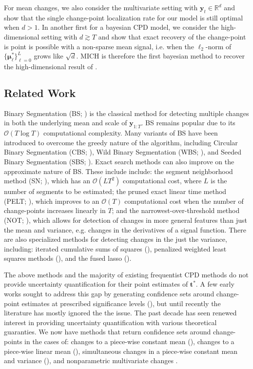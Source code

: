 For mean changes, we also consider the multivariate setting with $\mathbf{y}_t \in \mathbb{R}^d$ and show that the single change-point localization rate for our model is still optimal when $d > 1$. In another first for a bayesian CPD model, we consider the high-dimensional setting with $d \gtrsim T$ and show that exact recovery of the change-point is point is possible with a non-sparse mean signal, i.e. when the $\ell_2$-norm of $\{\boldsymbol{\mu}^*_\ell\}_{\ell=0}^{L}$ grows like $\sqrt{d}$. MICH is therefore the first bayesian method to recover the high-dimensional result of \cite{Bai10}.  

\subsection{Related Work}

Binary Segmentation (BS; \citealp{Scott74, Sen75, Vostrikova81}) is the classical method for detecting multiple changes in both the underlying mean and scale of $\mathbf{y}_{1:T}$. BS remains popular due to its $\mathcal{O}(T\log T)$ computational complexity. Many variants of BS have been introduced to overcome the greedy nature of the algorithm, including Circular Binary Segmentation (CBS; \citealp{Olshen04}), Wild Binary Segmentation (WBS; \citealp{Fryzlewicz14}), and Seeded Binary Segmentation (SBS; \citealp{Kovacs22}). Exact search methods can also improve on the approximate nature of BS. These include include: the segment neighborhood method (SN; \citealp{Auger89}), which has an $\mathcal{O}(LT^2)$ computational cost, where $L$ is the number of segments to be estimated; the pruned exact linear time method (PELT; \citealp{Killick12}), which improves to an $\mathcal{O}(T)$ computational cost when the number of change-points increases linearly in $T$; and the narrowest-over-threshold method (NOT; \citealp{Baranowski19}), which allows for detection of changes in more general features than just the mean and variance, e.g. changes in the derivatives of a signal function. There are also specialized methods for detecting changes in the just the variance, including: iterated cumulative sums of squares (\citealp{Inclan94}), penalized weighted least squares methods (\citealp{Chen97, Gao19}), and the fused lasso (\citealp{Padilla22}). 

The above methods and the majority of existing frequentist CPD methods do not provide uncertainty quantification for their point estimates of $\mathbf{t}^*$. A few early works sought to address this gap by generating confidence sets around change-point estimates at prescribed significance levels (\citealp{Worsley86, Siegmund86, Bai03}), but until recently the literature has mostly ignored the the issue. The past decade has seen renewed interest in providing uncertainty quantification with various theoretical guaranties. We now have methods that return confidence sets around change-points in the cases of: changes to a piece-wise constant mean (\citealp{Frick14, Fang20, Jewell22}), changes to a piece-wise linear mean (\citealp{Fryzlewicz23}),  simultaneous changes in a piece-wise constant mean and variance (\citealp{Bai10, Pein17, Eichinger18}), and nonparametric multivariate changes \cite{madrid2023change}.

